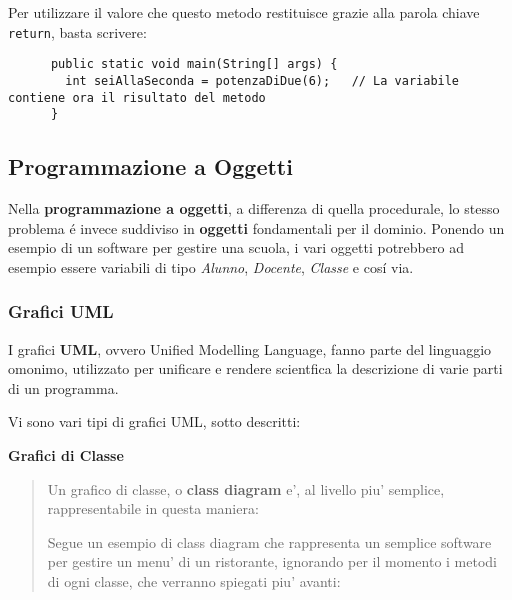 \documentclass{article}
\begin{document}
{    Per utilizzare il valore che questo metodo restituisce grazie alla parola chiave \texttt{return}, basta scrivere:

    \begin{verbatim}
      public static void main(String[] args) {
        int seiAllaSeconda = potenzaDiDue(6);   // La variabile contiene ora il risultato del metodo
      }
    \end{verbatim}

    \subsection{Programmazione a Oggetti}
    Nella \textbf{programmazione a oggetti}, a differenza di quella procedurale, lo stesso problema é invece suddiviso in \textbf{oggetti} fondamentali per il dominio. Ponendo un esempio di un software per gestire una scuola, i vari oggetti potrebbero ad esempio essere variabili di tipo \textit{Alunno}, \textit{Docente}, \textit{Classe} e cosí via.

    \subsubsection{Grafici UML}
    I grafici \textbf{UML}, ovvero Unified Modelling Language, fanno parte del linguaggio omonimo, utilizzato per unificare e rendere scientfica la descrizione di varie parti di un programma.

    Vi sono vari tipi di grafici UML, sotto descritti:

    \textbf{Grafici di Classe}
    \begin{quote}
      Un grafico di classe, o \textbf{class diagram} e', al livello piu' semplice, rappresentabile in questa maniera:


      Segue un esempio di class diagram che rappresenta un semplice software per gestire un menu' di un ristorante, ignorando per il momento i metodi di ogni classe, che verranno spiegati piu' avanti:

\end{quote}}
\end{document}
